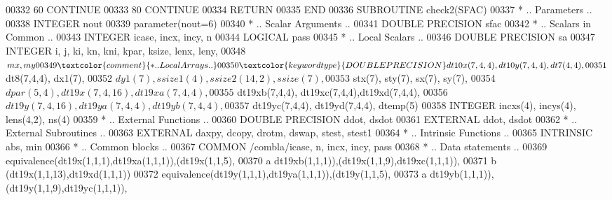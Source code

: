 \begin{DoxyCode}
00332    60    \textcolor{keywordflow}{CONTINUE}
00333    80 \textcolor{keywordflow}{CONTINUE}
00334       \textcolor{keywordflow}{RETURN}
00335 \textcolor{keyword}{      END}
00336 \textcolor{keyword}{      SUBROUTINE }check2(SFAC)
00337 \textcolor{comment}{*     .. Parameters ..}
00338       \textcolor{keywordtype}{INTEGER}           nout
00339       parameter(nout=6)
00340 \textcolor{comment}{*     .. Scalar Arguments ..}
00341       \textcolor{keywordtype}{DOUBLE PRECISION}  sfac
00342 \textcolor{comment}{*     .. Scalars in Common ..}
00343       \textcolor{keywordtype}{INTEGER}           icase, incx, incy, n
00344       \textcolor{keywordtype}{LOGICAL}           pass
00345 \textcolor{comment}{*     .. Local Scalars ..}
00346       \textcolor{keywordtype}{DOUBLE PRECISION}  sa
00347       \textcolor{keywordtype}{INTEGER}           i, j, ki, kn, kni, kpar, ksize, lenx, leny,
00348      $                  mx, my 
00349 \textcolor{comment}{*     .. Local Arrays ..}
00350       \textcolor{keywordtype}{DOUBLE PRECISION}  dt10x(7,4,4), dt10y(7,4,4), dt7(4,4),
00351      $                  dt8(7,4,4), dx1(7),
00352      $                  dy1(7), ssize1(4), ssize2(14,2), ssize(7),
00353      $                  stx(7), sty(7), sx(7), sy(7),
00354      $                  dpar(5,4), dt19x(7,4,16),dt19xa(7,4,4),
00355      $                  dt19xb(7,4,4), dt19xc(7,4,4),dt19xd(7,4,4),
00356      $                  dt19y(7,4,16), dt19ya(7,4,4),dt19yb(7,4,4),
00357      $                  dt19yc(7,4,4), dt19yd(7,4,4), dtemp(5)
00358       \textcolor{keywordtype}{INTEGER}           incxs(4), incys(4), lens(4,2), ns(4)
00359 \textcolor{comment}{*     .. External Functions ..}
00360       \textcolor{keywordtype}{DOUBLE PRECISION}  ddot, dsdot
00361       \textcolor{keywordtype}{EXTERNAL}          ddot, dsdot
00362 \textcolor{comment}{*     .. External Subroutines ..}
00363       \textcolor{keywordtype}{EXTERNAL}          daxpy, dcopy, drotm, dswap, stest, stest1
00364 \textcolor{comment}{*     .. Intrinsic Functions ..}
00365       \textcolor{keywordtype}{INTRINSIC}         abs, min
00366 \textcolor{comment}{*     .. Common blocks ..}
00367       \textcolor{keyword}{COMMON}            /combla/icase, n, incx, incy, pass
00368 \textcolor{comment}{*     .. Data statements ..}
00369       equivalence(dt19x(1,1,1),dt19xa(1,1,1)),(dt19x(1,1,5),
00370      a   dt19xb(1,1,1)),(dt19x(1,1,9),dt19xc(1,1,1)),
00371      b   (dt19x(1,1,13),dt19xd(1,1,1))
00372       equivalence(dt19y(1,1,1),dt19ya(1,1,1)),(dt19y(1,1,5),
00373      a   dt19yb(1,1,1)),(dt19y(1,1,9),dt19yc(1,1,1)),

\end{DoxyCode}
